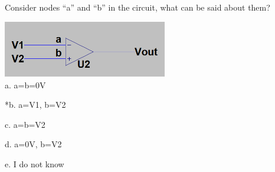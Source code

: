 
Consider nodes ``a'' and ``b'' in the circuit, what can be said about them?

\includegraphics[width=2.8278in,height=0.97396in]{../../Images/OPampsTransistorsDiodesQ5.png} \\

a. a=b=0V

*b. a=V1, b=V2

c. a=b=V2

d. a=0V, b=V2

e. I do not know \\
